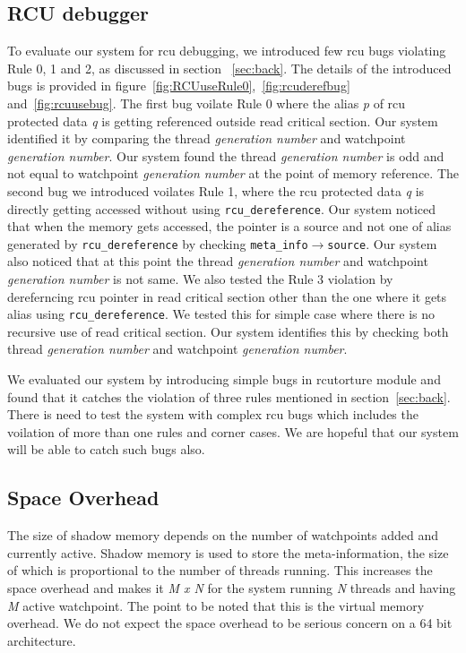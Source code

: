 \subsection {RCU debugger}
To evaluate our system for rcu debugging, we introduced few rcu bugs violating Rule 0, 1 and 2, as discussed in section ~\ref{sec:back}. The details of the introduced bugs is provided in figure~\ref{fig:RCUuseRule0},~\ref{fig:rcuderefbug} and~\ref{fig:rcuusebug}. The first bug voilate Rule 0 where the alias \emph{p} of rcu protected data \emph{q} is getting referenced outside read critical section. Our system identified it by comparing the thread \emph{generation number} and watchpoint \emph{generation number}. Our system found the thread \emph{generation number} is odd and not equal to watchpoint \emph{generation number} at the point of memory reference. The second bug we introduced voilates Rule 1, where the rcu protected data \emph{q} is directly getting accessed without using \texttt{rcu\_dereference}. Our system noticed that when the memory gets accessed, the pointer is a source and not one of  alias generated by \texttt{rcu\_dereference} by checking \texttt{meta\_info$\to$source}. Our system also noticed that at this point the thread \emph{generation number} and watchpoint \emph{generation number} is not same. We also tested the Rule 3 violation by dereferncing rcu pointer in read critical section other than the one where it gets alias using \texttt{rcu\_dereference}. We tested this for simple case where there is no recursive use of read critical section. Our system identifies this by checking both thread \emph{generation number} and watchpoint \emph{generation number}. 

We evaluated our system by introducing simple bugs in rcutorture module and found that it catches the violation of three rules mentioned in section~\ref{sec:back}. There is need to test the system with complex rcu bugs which includes the voilation of more than one rules and corner cases. We are hopeful that our system will be able to catch such bugs also.


\subsection{Space Overhead}
The size of shadow memory depends on the number of watchpoints added and currently active. Shadow memory is used to store the meta-information, the size of which is proportional to the number of threads running. This increases the space overhead and makes it \emph{M x N} for the system running \emph{N} threads and having \emph{M} active watchpoint. The point to be noted that this is the virtual memory overhead. We do not expect the space overhead to be serious concern on a 64 bit architecture.    


